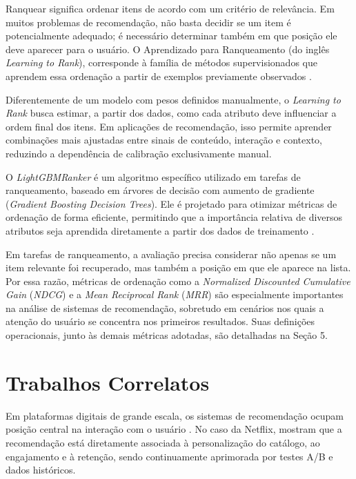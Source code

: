 \documentclass[a4paper,12pt]{article}
\begin{document}
Ranquear significa ordenar itens de acordo com um critério de relevância. Em muitos problemas de recomendação, não basta decidir se um item é potencialmente adequado; é necessário determinar também em que posição ele deve aparecer para o usuário. O Aprendizado para Ranqueamento (do inglês \textit{Learning to Rank}), corresponde à família de métodos supervisionados que aprendem essa ordenação a partir de exemplos previamente observados \cite{Burges2010LTROverview}.

Diferentemente de um modelo com pesos definidos manualmente, o \textit{Learning to Rank} busca estimar, a partir dos dados, como cada atributo deve influenciar a ordem final dos itens. Em aplicações de recomendação, isso permite aprender combinações mais ajustadas entre sinais de conteúdo, interação e contexto, reduzindo a dependência de calibração exclusivamente manual.

O \textit{LightGBMRanker} é um algoritmo específico utilizado em tarefas de ranqueamento, baseado em árvores de decisão com aumento de gradiente (\textit{Gradient Boosting Decision Trees}). Ele é projetado para otimizar métricas de ordenação de forma eficiente, permitindo que a importância relativa de diversos atributos seja aprendida diretamente a partir dos dados de treinamento \cite{Ke2017LightGBM}.

Em tarefas de ranqueamento, a avaliação precisa considerar não apenas se um item relevante foi recuperado, mas também a posição em que ele aparece na lista. Por essa razão, métricas de ordenação como a \textit{Normalized Discounted Cumulative Gain} (\textit{NDCG}) \cite{Jarvelin2002NDCG} e a \textit{Mean Reciprocal Rank} (\textit{MRR}) \cite{Craswell2009MRR} são especialmente importantes na análise de sistemas de recomendação, sobretudo em cenários nos quais a atenção do usuário se concentra nos primeiros resultados. Suas definições operacionais, junto às demais métricas adotadas, são detalhadas na Seção 5.




\section{Trabalhos Correlatos}


Em plataformas digitais de grande escala, os sistemas de recomendação ocupam posição central na interação com o usuário \cite{10.1145/3285029}. No caso da Netflix,  mostram que a recomendação está diretamente associada à personalização do catálogo, ao engajamento e à retenção, sendo continuamente aprimorada por testes A/B e dados históricos.
\end{document}
